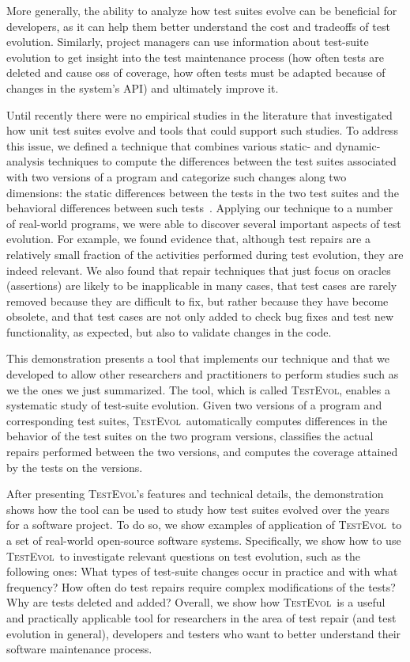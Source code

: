 \documentclass[conference]{IEEEtran}
\newcommand{\tool}{\textsc{TestEvol}\xspace}
\begin{document}
More generally, the ability to analyze how test suites evolve can be
beneficial for developers, as it can help them better understand the
cost and tradeoffs of test evolution. Similarly, project managers can
use information about test-suite evolution to get insight into the
test maintenance process (\eg how often tests are deleted and cause
oss of coverage, how often tests must be adapted because of changes in
the system's API) and ultimately improve it.

Until recently there were no empirical studies in the literature that
investigated how unit test suites evolve and tools that could support
such studies. To address this issue, we defined a technique that
combines various static- and dynamic-analysis techniques to compute
the differences between the test suites associated with two versions
of a program and categorize such changes along two dimensions: the
static differences between the tests in the two test suites and the
behavioral differences between such tests~\cite{pinto12}. Applying our
technique to a number of real-world programs, we were able to discover
several important aspects of test evolution. For example, we found
evidence that, although test repairs are a relatively small fraction
of the activities performed during test evolution, they are indeed
relevant.  We also found that repair techniques that just focus on
oracles (\ie assertions) are likely to be inapplicable in many cases,
that test cases are rarely removed because they are difficult to fix,
but rather because they have become obsolete, and that test cases are
not only added to check bug fixes and test new functionality, as
expected, but also to validate changes in the code.

This demonstration presents a tool that implements our technique and
that we developed to allow other researchers and practitioners to
perform studies such as we the ones we just summarized. The tool,
which is called \tool, enables a systematic study of test-suite
evolution.  Given two versions of a program and corresponding test
suites, \tool\ automatically computes differences in the behavior of
the test suites on the two program versions, classifies the actual
repairs performed between the two versions, and computes the coverage
attained by the tests on the versions.

After presenting \tool's features and technical details, the
demonstration shows how the tool can be used to study how test suites
evolved over the years for a software project.  To do so, we show
examples of application of \tool\ to a set of real-world open-source
software systems.  Specifically, we show how to use \tool\ to
investigate relevant questions on test evolution, such as the
following ones: What types of test-suite changes occur in practice and
with what frequency?  How often do test repairs require complex
modifications of the tests?  Why are tests deleted and added? Overall,
we show how \tool\ is a useful and practically applicable tool for
researchers in the area of test repair (and test evolution in
general), developers and testers who want to better understand their
software maintenance process.
\end{document}
